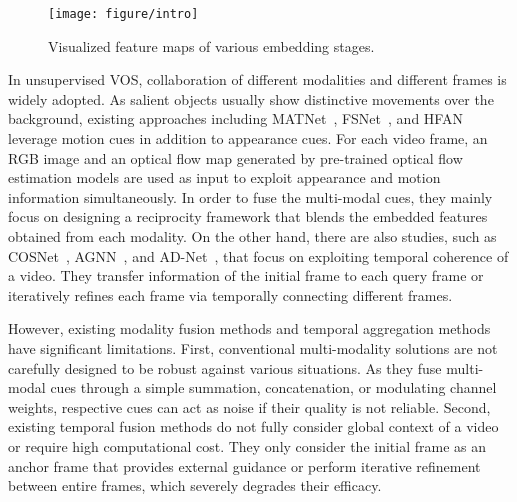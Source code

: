 \documentclass[10pt,twocolumn,letterpaper]{article}
\begin{document}
\begin{figure}[t]
\centering
\texttt{[image: figure/intro]}
\caption{Visualized feature maps of various embedding stages.}
\label{figure1}
\end{figure}



In unsupervised VOS, collaboration of different modalities and different frames is widely adopted. As salient objects usually show distinctive movements over the background, existing approaches including MATNet~\cite{MATNet}, FSNet~\cite{FSNet}, and HFAN~\cite{HFAN} leverage motion cues in addition to appearance cues. For each video frame, an RGB image and an optical flow map generated by pre-trained optical flow estimation models are used as input to exploit appearance and motion information simultaneously. In order to fuse the multi-modal cues, they mainly focus on designing a reciprocity framework that blends the embedded features obtained from each modality. On the other hand, there are also studies, such as COSNet~\cite{COSNet}, AGNN~\cite{AGNN}, and AD-Net~\cite{AD-Net}, that focus on exploiting temporal coherence of a video. They transfer information of the initial frame to each query frame or iteratively refines each frame via temporally connecting different frames. 


However, existing modality fusion methods and temporal aggregation methods have significant limitations. First, conventional multi-modality solutions are not carefully designed to be robust against various situations. As they fuse multi-modal cues through a simple summation, concatenation, or modulating channel weights, respective cues can act as noise if their quality is not reliable. Second, existing temporal fusion methods do not fully consider global context of a video or require high computational cost. They only consider the initial frame as an anchor frame that provides external guidance or perform iterative refinement between entire frames, which severely degrades their efficacy.
\end{document}
